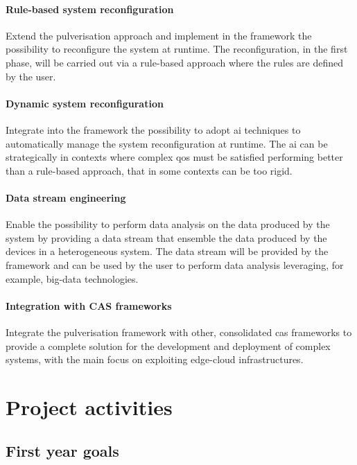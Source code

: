 \documentclass[12pt]{article}
\begin{document}
\paragraph{Rule-based system reconfiguration}
Extend the pulverisation approach and implement in the framework the possibility to
reconfigure the system at runtime.
%
The reconfiguration,
in the first phase,
will be carried out via a rule-based approach where the rules are defined by the user.

\paragraph{Dynamic system reconfiguration}
Integrate into the framework the possibility to adopt \ac{ai} techniques to automatically
manage the system reconfiguration at runtime.
%
The \ac{ai} can be strategically in contexts where complex \ac{qos} must be satisfied
performing better than a rule-based approach, that in some contexts can be too rigid.

\paragraph{Data stream engineering}
Enable the possibility to perform data analysis on the data produced by the system by providing
a data stream that ensemble the data produced by the devices in a heterogeneous system.
%
The data stream will be provided by the framework and can be used by the user to perform
data analysis leveraging,
for example,
big-data technologies.

\paragraph{Integration with CAS frameworks}
Integrate the pulverisation framework with other, consolidated \ac{cas} frameworks
to provide a complete solution for the development and deployment of complex systems,
with the main focus on exploiting edge-cloud infrastructures.


\section{Project activities}\label{sec:activities}

\subsection{First year goals}\label{subsec:first-year-activities}
\end{document}
